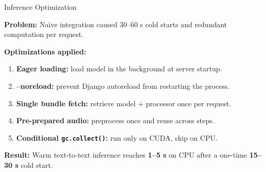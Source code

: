 \documentclass{beamer}
\begin{document}
\begin{frame}[t]{Inference Optimization}
\small

\textbf{Problem:} Na\"ive integration caused 30--60 s cold starts and
redundant computation per request.

\vspace{4pt}
\textbf{Optimizations applied:}
\begin{enumerate}\setlength{\itemsep}{3pt}
    \item \textbf{Eager loading:} load model in the background at server startup.
    \item \textbf{--noreload:} prevent Django autoreload from restarting the process.
    \item \textbf{Single bundle fetch:} retrieve model + processor once per request.
    \item \textbf{Pre-prepared audio:} preprocess once and reuse across steps.
    \item \textbf{Conditional \texttt{gc.collect()}:} run only on CUDA, skip on CPU.
\end{enumerate}

\vspace{4pt}
\textbf{Result:} Warm text-to-text inference reaches \textbf{1--5 s} on CPU
after a one-time \textbf{15--30 s} cold start.
\end{frame}
\end{document}
